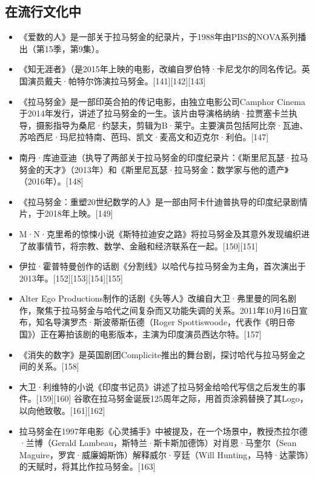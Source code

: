 \subsection{在流行文化中}
\begin{itemize}
\item 《爱数的人》是一部关于拉马努金的纪录片，于1988年由PBS的NOVA系列播出（第15季，第9集）。
\item 《知无涯者》（是2015年上映的电影，改编自罗伯特·卡尼戈尔的同名传记。英国演员戴夫·帕特尔饰演拉马努金。[141][142][143]
\item 《拉马努金》是一部印英合拍的传记电影，由独立电影公司Camphor Cinema于2014年发行，讲述了拉马努金的一生。该片由导演格纳纳·拉贾塞卡兰执导，摄影指导为桑尼·约瑟夫，剪辑为B·莱宁。主要演员包括阿比奈·瓦迪、苏哈西尼·玛尼拉特南、芭玛、凯文·麦高文和迈克尔·利伯。[147]
\item 南丹·库迪亚迪（执导了两部关于拉马努金的印度纪录片：《斯里尼瓦瑟·拉马努金的天才》（2013年）和《斯里尼瓦瑟·拉马努金：数学家与他的遗产》（2016年）。[148]
\item 《拉马努金：重塑20世纪数学的人》是一部由阿卡什迪普执导的印度纪录剧情片，于2018年上映。[149]
\item M·N·克里希的惊悚小说《斯特拉迪安之路》将拉马努金及其意外发现编织进了故事情节，将宗教、数学、金融和经济联系在一起。[150][151]
\item 伊拉·霍普特曼创作的话剧《分割线》以哈代与拉马努金为主角，首次演出于2013年。[152][153][154][155]
\item Alter Ego Productions制作的话剧《头等人》改编自大卫·弗里曼的同名剧作，聚焦于拉马努金与哈代之间复杂而又功能失调的关系。2011年10月16日宣布，知名导演罗杰·斯波蒂斯伍德（Roger Spottiswoode，代表作《明日帝国》）正在筹拍该剧的电影版本，主演为印度演员西达尔特。[157]
\item 《消失的数字》是英国剧团Complicite推出的舞台剧，探讨哈代与拉马努金之间的关系。[158]
\item 大卫·利维特的小说《印度书记员》讲述了拉马努金给哈代写信之后发生的事件。[159][160]
谷歌在拉马努金诞辰125周年之际，用首页涂鸦替换了其Logo，以向他致敬。[161][162]
\item 拉马努金在1997年电影《心灵捕手》中被提及，在一个场景中，教授杰拉尔德·兰博（Gerald Lambeau，斯特兰·斯卡斯加德饰）对肖恩·马奎尔（Sean Maguire，罗宾·威廉姆斯饰）解释威尔·亨廷（Will Hunting，马特·达蒙饰）的天赋时，将其比作拉马努金。[163]
\end{itemize}
